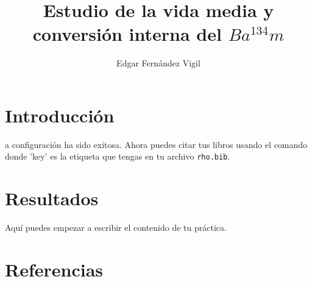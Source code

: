 \documentclass[9pt,a4paper,twocolumn,twoside]{rho-class/rho}
\title{Estudio de la vida media y conversión interna del $Ba^{134} m$}
\author{Edgar Fernández Vigil}
\affil{Física - Facultad de Ciencias - Universidad de Oviedo}
\begin{document}
    \maketitle
    \thispagestyle{firststyle}

\section{Introducción}
    a configuración ha sido exitosa. Ahora puedes citar 
    tus libros usando el comando \cite{key} donde 'key' es la 
    etiqueta que tengas en tu archivo \texttt{rho.bib}.

\section{Resultados}
    Aquí puedes empezar a escribir el contenido de tu práctica.

\newpage
\section{Referencias}
\printbibliography[heading=none]
\end{document}
